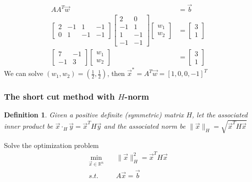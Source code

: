 \documentclass[11pt,a4paper]{article}
\newtheorem{definition}{Definition}
\begin{document}
\begin{equation}
    \begin{aligned}
        AA^T \vec{w}&=\vec{b}\\
        \begin{bmatrix}
            2&-1&1&-1\\
            0&1&-1&-1
        \end{bmatrix}
        \begin{bmatrix}
            2&0\\-1&1\\1&-1\\-1&-1
        \end{bmatrix}
        \begin{bmatrix}
            w_1\\w_2
        \end{bmatrix}&=
        \begin{bmatrix}
           3\\1
        \end{bmatrix}\\
        \begin{bmatrix}
            7&-1\\-1&3
        \end{bmatrix}
        \begin{bmatrix}
            w_1\\w_2
        \end{bmatrix}&=
        \begin{bmatrix}
           3\\1
        \end{bmatrix}
    \end{aligned}
    \nonumber
\end{equation}
We can solve $(w_1,w_2)=(\frac{1}{2},\frac{1}{2})$, then $\vec{x}^*=A^T \vec{w}=[1,0,0,-1]^T$

\subsubsection{The short cut method with $H$-norm}
\begin{definition}
    Given a positive definite (symmetric) matrix $H$, let the associated inner product be $\vec{x}\cdot_H \vec{y}= \vec{x}^T H \vec{y}$ and the associated norm be $\|\vec{x}\|_H=\sqrt{\vec{x}^T H \vec{x}}$
\end{definition}
Solve the optimization problem
\begin{equation}
    \begin{aligned}
        \min_{\vec{x}\in \mathbb{R}^n}\quad &\|\vec{x}\|_H^2=\vec{x}^T H \vec{x}\\
        s.t. \quad&A \vec{x}=\vec{b}
    \end{aligned}
    \nonumber
\end{equation}
\end{document}

